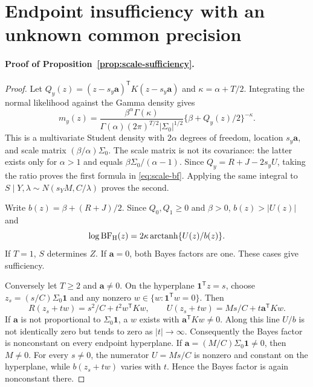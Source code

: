 \section{Endpoint insufficiency with an unknown common precision}
\label{app:scale-extension}

\paragraph{Proof of Proposition~\ref{prop:scale-sufficiency}.}
\begin{proof}
Let $Q_y(z)=(z-s_y\boldsymbol a)^\mathsf T K(z-s_y\boldsymbol a)$ and
$\kappa=\alpha+T/2$. Integrating the normal likelihood against the Gamma
density gives
\begin{equation}
 m_y(z)=\frac{\beta^\alpha\Gamma(\kappa)}
 {\Gamma(\alpha)(2\pi)^{T/2}|\Sigma_0|^{1/2}}
 \{\beta+Q_y(z)/2\}^{-\kappa}.
 \label{eq:scale-density}
\end{equation}
This is a multivariate Student density with $2\alpha$ degrees of freedom,
location $s_y\boldsymbol a$, and scale matrix $(\beta/\alpha)\Sigma_0$.
The scale matrix is not its covariance: the latter exists only for
$\alpha>1$ and equals $\beta\Sigma_0/(\alpha-1)$.
Since $Q_y=R+J-2s_yU$, taking the ratio proves the first formula in
\eqref{eq:scale-bf}. Applying the same integral to
$S\mid Y,\lambda\sim N(s_YM,C/\lambda)$ proves the second.

Write $b(z)=\beta+(R+J)/2$. Since $Q_0,Q_1\geq0$ and $\beta>0$,
$b(z)>|U(z)|$ and
\[
 \log\mathrm{BF}_{\rm H}(z)
 =2\kappa\operatorname{arctanh}\{U(z)/b(z)\}.
\]
If $T=1$, $S$ determines $Z$. If $\boldsymbol a=0$, both Bayes factors
are one. These cases give sufficiency.

Conversely let $T\geq2$ and $\boldsymbol a\ne0$. On the hyperplane
$\boldsymbol1^\mathsf Tz=s$, choose
$z_s=(s/C)\Sigma_0\boldsymbol1$ and any nonzero
$w\in\{w:\boldsymbol1^\mathsf Tw=0\}$. Then
\[
 R(z_s+tw)=s^2/C+t^2w^\mathsf TKw,\qquad
 U(z_s+tw)=Ms/C+t\boldsymbol a^\mathsf TKw.
\]
If $\boldsymbol a$ is not proportional to $\Sigma_0\boldsymbol1$, a
$w$ exists with $\boldsymbol a^\mathsf TKw\ne0$. Along this line
$U/b$ is not identically zero but tends to zero as $|t|\to\infty$.
Consequently the Bayes factor is nonconstant on every endpoint hyperplane.
If $\boldsymbol a=(M/C)\Sigma_0\boldsymbol1\ne0$, then $M\ne0$.
For every $s\ne0$, the numerator $U=Ms/C$ is nonzero and constant on the
hyperplane, while $b(z_s+tw)$ varies with $t$. Hence the Bayes factor is
again nonconstant there.


\end{proof}

